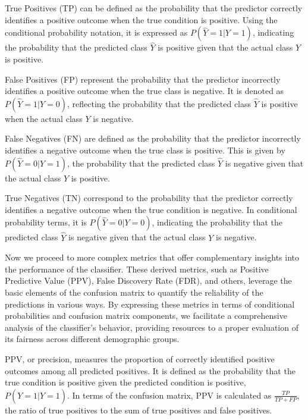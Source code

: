 True Positives (TP) can be defined as the probability that the predictor correctly identifies a positive outcome when the true condition is positive. Using the conditional probability notation, it is expressed as $P(\hat{Y}=1|Y=1)$, indicating the probability that the predicted class $\hat{Y}$ is positive given that the actual class $Y$ is positive.

False Positives (FP) represent the probability that the predictor incorrectly identifies a positive outcome when the true class is negative. It is denoted as $P(\hat{Y}=1|Y=0)$, reflecting the probability that the predicted class $\hat{Y}$ is positive when the actual class $Y$ is negative.

False Negatives (FN) are defined as the probability that the predictor incorrectly identifies a negative outcome when the true class is positive. This is given by $P(\hat{Y}=0|Y=1)$, the probability that the predicted class $\hat{Y}$ is negative given that the actual class $Y$ is positive.

True Negatives (TN) correspond to the probability that the predictor correctly identifies a negative outcome when the true condition is negative. In conditional probability terms, it is $P(\hat{Y}=0|Y=0)$, indicating the probability that the predicted class $\hat{Y}$ is negative given that the actual class $Y$ is negative.

Now we proceed to more complex metrics that offer complementary insights into the performance of the classifier. These derived metrics, such as Positive Predictive Value (PPV), False Discovery Rate (FDR), and others, leverage the basic elements of the confusion matrix to quantify the reliability of the predictions in various ways. By expressing these metrics in terms of conditional probabilities and confusion matrix components, we facilitate a comprehensive analysis of the classifier's behavior, providing resources to a proper evaluation of its fairness across different demographic groups.

\begin{definition}\label{def:ppv}
PPV, or precision, measures the proportion of correctly identified positive outcomes among all predicted positives. It is defined as the probability that the true condition is positive given the predicted condition is positive, $P(Y=1|\hat{Y}=1)$. In terms of the confusion matrix, PPV is calculated as $\frac{TP}{TP + FP}$, the ratio of true positives to the sum of true positives and false positives.
\end{definition}

